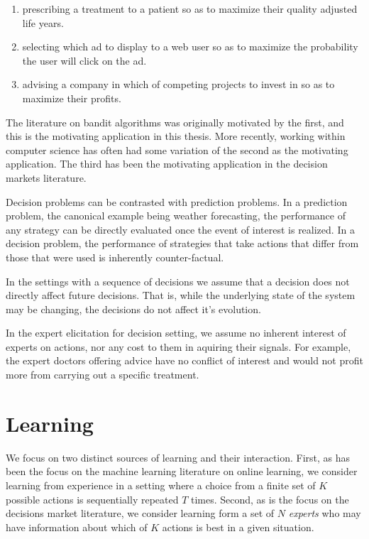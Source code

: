 \begin{enumerate}
	\item  prescribing a treatment to a patient so as to maximize their quality adjusted life years.
	\item selecting which ad to display to a web user so as to maximize the probability the user will click on the ad.
	\item advising a company in which of competing projects to invest in so as to maximize their profits.
\end{enumerate}

The literature on bandit algorithms was originally motivated by the first, and this is the motivating application in this thesis. More recently, working within computer science has often had some variation of the second as the motivating application. The third has been the motivating application in the decision markets literature.

Decision problems can be contrasted with prediction problems.
In a prediction problem, the canonical example being weather forecasting, the performance of any strategy can be directly evaluated once the event of interest is realized.
In a decision problem, the performance of strategies that take actions that differ from those that were used is inherently counter-factual.

In the settings with a sequence of decisions we assume that a decision does not directly affect  future decisions. That is, while the underlying state of the system may be changing, the decisions do not affect it's evolution.

In the expert elicitation for decision setting, we assume no inherent interest of experts on actions, nor any cost to them in aquiring their signals.
For example, the expert doctors offering advice have no conflict of interest and would not profit more from carrying out a specific treatment.


\section{Learning}

We focus on two distinct sources of learning and their interaction.
First, as has been the focus on the machine learning literature on online learning, we consider learning from experience in a setting where a choice from a finite set of $K$ possible actions is sequentially repeated $T$ times.
Second, as is the focus on the decisions market literature, we consider learning form a set of $N$ \emph{experts} who may have information about which of $K$ actions is best in a given situation.

